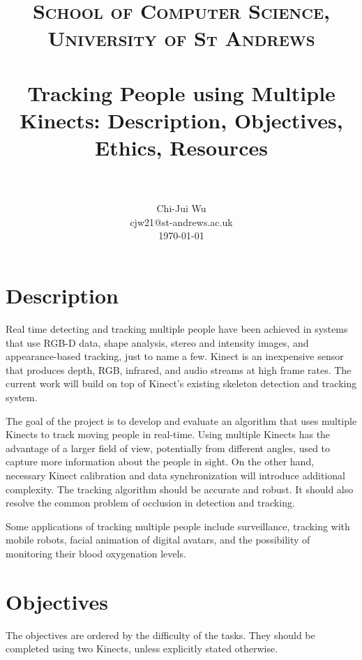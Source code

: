 \documentclass[paper=a4, fontsize=11pt]{scrartcl}
\title{
		\vspace{-3ex}
		\usefont{OT1}{bch}{b}{n}
		\normalfont \normalsize \textsc{School of Computer Science, University of St Andrews} \\ [25pt]
		\horrule{0.5pt} \\[0.2cm]
		\huge Tracking People using Multiple Kinects: Description, Objectives, Ethics, Resources \\
		\horrule{2pt} \\[0.2cm]
		\vspace{-2ex}
}
\author{
		\normalfont \normalsize
        Chi-Jui Wu\\[-3pt] \normalsize
        {cjw21@st-andrews.ac.uk}\\[-3pt] \normalsize
        \today
}
\date{}
\numberwithin{equation}{section}
\numberwithin{figure}{section}
\numberwithin{table}{section}
\begin{document}
\maketitle

\section{Description}

Real time detecting and tracking multiple people have been achieved in systems that use RGB-D data\cite{track_rgbd}, shape analysis, stereo and intensity images\cite{w4s}, and appearance-based tracking\cite{track_robust}, just to name a few. Kinect is an inexpensive sensor that produces depth, RGB, infrared, and audio streams at high frame rates. The current work will build on top of Kinect's existing skeleton detection and tracking system.

The goal of the project is to develop and evaluate an algorithm that uses multiple Kinects to track moving people in real-time. Using multiple Kinects has the advantage of a larger field of view, potentially from different angles, used to capture more information about the people in sight. On the other hand, necessary Kinect calibration and data synchronization will introduce additional complexity. The tracking algorithm should be accurate and robust. It should also resolve the common problem of occlusion in detection and tracking.

Some applications of tracking multiple people include surveillance\cite{surveillance}, tracking with mobile robots\cite{mobile}, facial animation of digital avatars\cite{facial_animation}, and the possibility of monitoring their blood oxygenation levels.

\section{Objectives}

The objectives are ordered by the difficulty of the tasks. They should be completed using two Kinects, unless explicitly stated otherwise.
\end{document}
